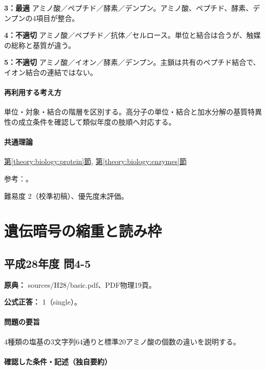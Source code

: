 \noindent\textbf{3：最適} アミノ酸／ペプチド／酵素／デンプン。アミノ酸、ペプチド、酵素、デンプンの4項目が整合。\par

\noindent\textbf{4：不適切} アミノ酸／ペプチド／抗体／セルロース。単位と結合は合うが、触媒の総称と基質が違う。\par

\noindent\textbf{5：不適切} アミノ酸／イオン／酵素／デンプン。主鎖は共有のペプチド結合で、イオン結合の連結ではない。\par

\paragraph{再利用する考え方} 単位・対象・結合の階層を区別する。高分子の単位・結合と加水分解の基質特異性の成立条件を確認して類似年度の肢順へ対応する。

\paragraph{共通理論} \hyperref[theory:biology:protein]{第\ref*{theory:biology:protein}節}, \hyperref[theory:biology:enzymes]{第\ref*{theory:biology:enzymes}節}

\par 参考：\cite{mit_amino,iubmb_amylase}。

\par 難易度 2（校準初稿）、優先度未評価。

\section{遺伝暗号の縮重と読み枠}

\subsection{平成28年度 問4-5}
\label{q:h28-reg-basic-4-5}

\noindent\textbf{原典：} sources/H28/basic.pdf、PDF物理19頁。

\textbf{公式正答：} 1（single）。

\paragraph{問題の要旨} 4種類の塩基の3文字列64通りと標準20アミノ酸の個数の違いを説明する。

\paragraph{確認した条件・記述（独自要約）}\mbox{}\par

